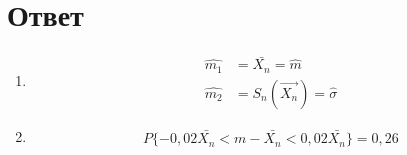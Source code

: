 \section*{Ответ}
\begin{enumerate}
	\item
		\begin{align*} 
			\widehat{m_1} &= \bar{X_n} = \widehat{m} \\
			\widehat{m_2} &= S_n(\vec{X_n}) = \widehat{\sigma}
		\end{align*}		

	\item
		\begin{gather*}
			P\{-0,02\bar{X_n} < m-\bar{X_n} < 0,02\bar{X_n}\} = 0,26
		\end{gather*} 
\end{enumerate}



